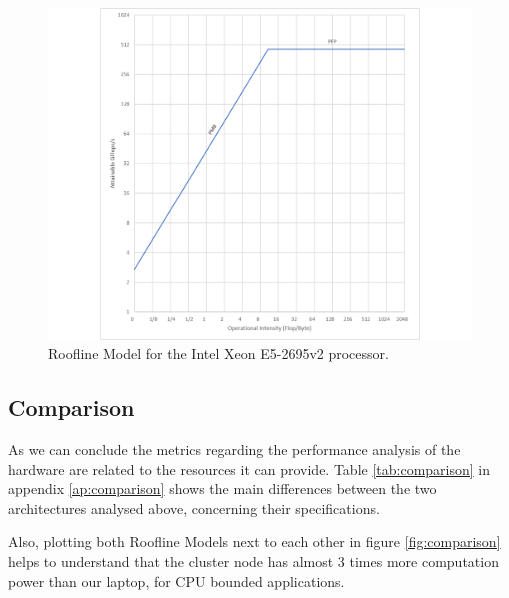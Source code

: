 \documentclass[twoside,twocolumn]{article}
\begin{document}
\begin{figure}[H]
    \includegraphics[width=\columnwidth]{xeon_roofline.png}
    \centering
    \caption{Roofline Model for the Intel Xeon E5-2695v2 processor.}
    \label{fig:xeonroofline}
\end{figure}

\subsection{Comparison}

As we can conclude the metrics regarding the performance analysis of the hardware are related to the resources it can provide. Table \ref{tab:comparison} in appendix \ref{ap:comparison} shows the main differences between the two architectures analysed above, concerning their specifications.

Also, plotting both Roofline Models next to each other in figure \ref{fig:comparison} helps to understand that the cluster node has almost 3 times more computation power than our laptop, for CPU bounded applications.
\end{document}
